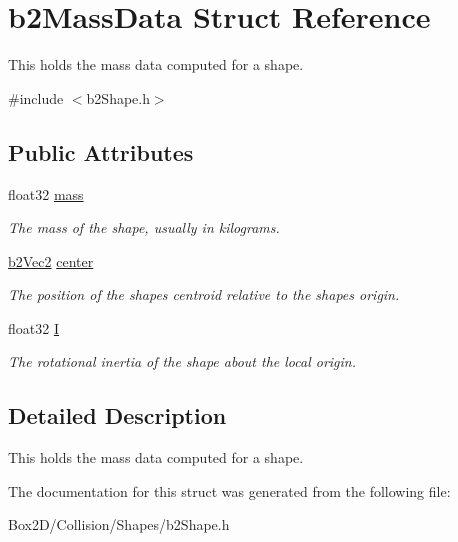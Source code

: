 \hypertarget{structb2_mass_data}{}\section{b2\+Mass\+Data Struct Reference}
\label{structb2_mass_data}


This holds the mass data computed for a shape.  




{\ttfamily \#include $<$b2\+Shape.\+h$>$}

\subsection*{Public Attributes}
\begin{DoxyCompactItemize}
\item 
\mbox{\label{structb2_mass_data_aea85d9595a38d2eed05b8d2ea80d97b1}} 
float32 \hyperlink{structb2_mass_data_aea85d9595a38d2eed05b8d2ea80d97b1}{mass}
\begin{DoxyCompactList}\small\item\em The mass of the shape, usually in kilograms. \end{DoxyCompactList}\item 
\mbox{\label{structb2_mass_data_a1d59bebc7030c4dded0c2febc57ebdd7}} 
\hyperlink{structb2_vec2}{b2\+Vec2} \hyperlink{structb2_mass_data_a1d59bebc7030c4dded0c2febc57ebdd7}{center}
\begin{DoxyCompactList}\small\item\em The position of the shape\textquotesingle{}s centroid relative to the shape\textquotesingle{}s origin. \end{DoxyCompactList}\item 
\mbox{\label{structb2_mass_data_ad2d06e96e2d79d895df16ae0e5fe0376}} 
float32 \hyperlink{structb2_mass_data_ad2d06e96e2d79d895df16ae0e5fe0376}{I}
\begin{DoxyCompactList}\small\item\em The rotational inertia of the shape about the local origin. \end{DoxyCompactList}\end{DoxyCompactItemize}


\subsection{Detailed Description}
This holds the mass data computed for a shape. 

The documentation for this struct was generated from the following file\+:\begin{DoxyCompactItemize}
\item 
Box2\+D/\+Collision/\+Shapes/b2\+Shape.\+h\end{DoxyCompactItemize}
